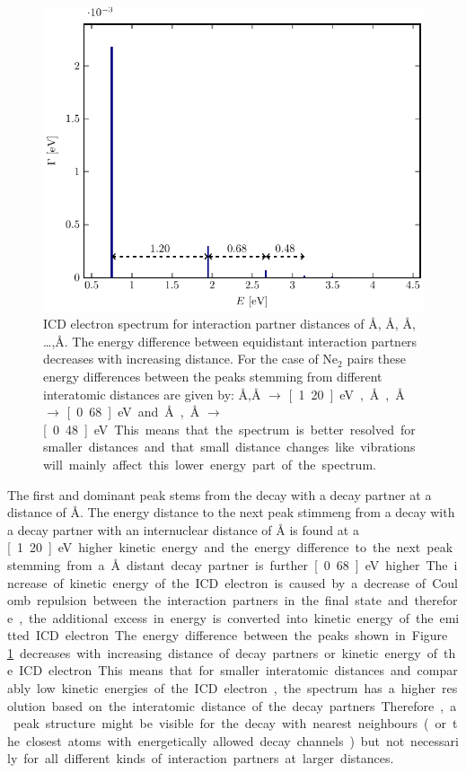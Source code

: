 \begin{figure}[h]
 \centering
 \includegraphics[width=\columnwidth]{pics/model_EGamma.pdf}
 \caption{ICD electron spectrum for interaction partner distances of
          \unit[3]{\AA}, \unit[4]{\AA}, \unit[5]{\AA}, \dots ,\unit[11]{\AA}.
          The energy difference between equidistant interaction partners
          decreases with increasing distance. For the case of Ne$_2$ pairs
          these energy differences between the peaks stemming from different
          interatomic distances are given by:
          \unit[3]{\AA},\unit[4]{\AA} $\rightarrow$ \unit[1.20]{eV},
          \unit[4]{\AA},\unit[5]{\AA} $\rightarrow$ \unit[0.68]{eV} and
          \unit[5]{\AA},\unit[6]{\AA} $\rightarrow$ \unit[0.48]{eV}.
          This means that the spectrum is better resolved for smaller distances
          and that small distance changes like vibrations will mainly affect
          this lower energy part of the spectrum.
}
 \label{figure:model_EGamma}
\end{figure}

The first and dominant peak stems from the decay with a decay
partner at a distance of \unit[3]{\AA}. The energy distance to the next peak
stimmeng from a decay with a decay partner with an internuclear distance of
\unit[4]{\AA} is found at a \unit[1.20]{eV} higher kinetic energy and the
energy difference to the next peak stemming from a \unit[5]{\AA} distant
decay partner is further \unit[0.68]{eV} higher. The increase of kinetic
energy of the ICD electron is caused by a decrease of Coulomb repulsion between
the interaction partners in the final state and therefore, the additional
excess in energy is converted into kinetic energy of the emitted ICD electron.
The energy difference between the peaks shown in Figure \ref{figure:model_EGamma}
decreases with increasing distance of decay partners or kinetic energy
of the ICD electron. This means that for smaller interatomic distances and
comparably low kinetic energies of the ICD electron, the spectrum has a higher
resolution based on the interatomic distance of the decay partners.
Therefore, a peak structure might be visible for the decay with nearest
neighbours (or the closest atoms with energetically allowed decay channels)
but not necessarily for all different kinds of interaction partners at larger
distances.

